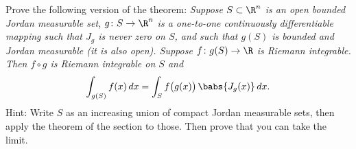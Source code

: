 \begin{exercise}
\pagebreak[2]
Prove the following version of the theorem:
\emph{Suppose $S \subset \R^n$ is an open bounded Jordan measurable set,
$g \colon S \to \R^n$ is a one-to-one
continuously differentiable mapping such that
$J_g$ is never zero on $S$, and such that $g(S)$ is bounded and
Jordan measurable (it is also open).
Suppose $f \colon g(S) \to \R$ is Riemann
integrable.  Then $f \circ g$ is Riemann integrable on $S$ and}
\begin{equation*}
\int_{g(S)} f(x) \, dx = 
\int_S f\bigl(g(x)\bigr) \, \babs{J_g(x)} \, dx .
\end{equation*}
Hint: Write $S$ as an increasing union of compact Jordan measurable
sets, then apply the theorem of the section to those.  Then prove that you
can take the limit.
\end{exercise}
